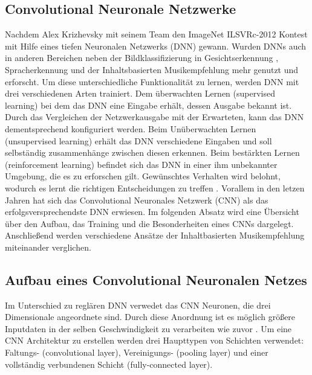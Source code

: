\documentclass[twosided,a4,10pt]{article}
\begin{document}
\begin{multicols}{2}
\section{Convolutional Neuronale Netzwerke}
Nachdem Alex Krizhevsky mit seinem Team den ImageNet ILSVRc-2012 Kontest mit Hilfe eines tiefen Neuronalen Netzwerks (DNN) gewann. Wurden DNNs auch in anderen Bereichen neben der Bildklassifizierung \cite{alex}  in Gesichtserkennung \cite{ding}, Spracherkennung \cite{graves} und der Inhaltsbasierten Musikempfehlung \cite{oord} mehr genutzt und erforscht.\newline
Um diese unterschiedliche Funktionalität zu lernen, werden DNN mit drei verschiedenen Arten trainiert. Dem überwachten Lernen (supervised learning) bei dem das DNN eine Eingabe erhält, dessen Ausgabe bekannt ist. Durch das Vergleichen der Netzwerkausgabe mit der Erwarteten, kann das DNN dementsprechend konfiguriert werden. Beim Unüberwachten Lernen (unsupervised learning) erhält das DNN verschiedene Eingaben und soll selbständig zusammenhänge zwischen diesen erkennen. Beim bestärkten Lernen (reinforcement learning) befindet sich das DNN in einer ihm unbekannter Umgebung, die es zu erforschen gilt. Gewünschtes Verhalten wird belohnt, wodurch es lernt die richtigen Entscheidungen zu treffen \cite{wang2}.\newline 
Vorallem in den letzen Jahren hat sich das Convolutional Neuronales Netzwerk (CNN) als das erfolgsversprechendste DNN erwiesen.\newline 
Im folgenden Absatz wird eine Übersicht über den Aufbau, das Training und die Besonderheiten eines CNNs dargelegt. Anschließend werden verschiedene Ansätze der Inhaltbasierten Musikempfehlung miteinander verglichen.

\subsection{Aufbau eines Convolutional Neuronalen Netzes}
Im Unterschied zu reglären DNN verwedet das CNN Neuronen, die drei Dimensionale angeordnete sind. Durch diese Anordnung ist es möglich größere Inputdaten in der selben Geschwindigkeit zu verarbeiten wie zuvor \cite{karpathy}. Um eine CNN Architektur zu erstellen werden drei Haupttypen von Schichten verwendet: Faltungs- (convolutional layer), Vereinigungs- (pooling layer) und einer vollständig verbundenen Schicht (fully-connected layer).


\end{multicols}
\end{document}
